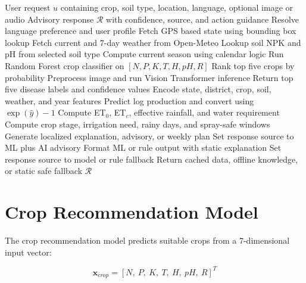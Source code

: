 \documentclass[12pt,a4paper]{report}
\begin{document}
\begin{algorithm}[htbp]
\caption{HARVEST Advisory Pipeline}
\label{alg:harvest}
\small
\begin{algorithmic}[1]
\renewcommand{\algorithmicrequire}{\textbf{Input:}}
\renewcommand{\algorithmicensure}{\textbf{Output:}}
\REQUIRE User request $u$ containing crop, soil type, location, language, optional image or audio
\ENSURE Advisory response $\mathcal{R}$ with confidence, source, and action guidance
\STATE Resolve language preference and user profile
\STATE Fetch GPS based state using bounding box lookup
\STATE Fetch current and 7-day weather from Open-Meteo
\STATE Lookup soil NPK and pH from selected soil type
\STATE Compute current season using calendar logic
  \STATE Run Random Forest crop classifier on $[N,P,K,T,H,pH,R]$
  \STATE Rank top five crops by probability
  \STATE Preprocess image and run Vision Transformer inference
  \STATE Return top five disease labels and confidence values
  \STATE Encode state, district, crop, soil, weather, and year features
  \STATE Predict log production and convert using $\exp(\hat{y}) - 1$
  \STATE Compute ET$_0$, ET$_c$, effective rainfall, and water requirement
  \STATE Compute crop stage, irrigation need, rainy days, and spray-safe windows
\ENDIF
{}
  \STATE Generate localized explanation, advisory, or weekly plan
  \STATE Set response source to ML plus AI advisory
  \STATE Format ML or rule output with static explanation
  \STATE Set response source to model or rule fallback
\ELSE
  \STATE Return cached data, offline knowledge, or static safe fallback
\ENDIF
\RETURN $\mathcal{R}$
\end{algorithmic}
\end{algorithm}

\section{Crop Recommendation Model}

The crop recommendation model predicts suitable crops from a 7-dimensional input vector:

\begin{equation}
\mathbf{x}_{crop} = [N,\ P,\ K,\ T,\ H,\ pH,\ R]^T
\end{equation}
\end{document}
